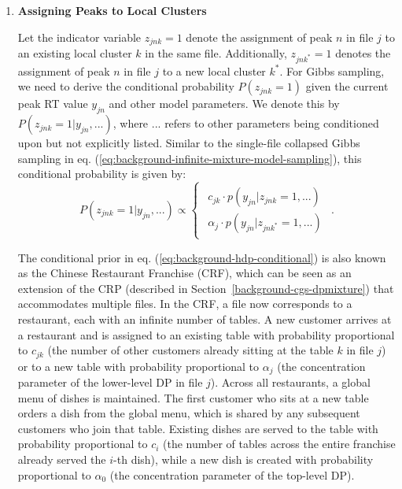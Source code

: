 \begin{enumerate}

\item \textbf{Assigning Peaks to Local Clusters}

Let the indicator variable $z_{jnk}=1$ denote the assignment of peak $n$ in file $j$ to an existing local cluster $k$ in the same file. Additionally, $z_{jnk^{*}}=1$ denotes the assignment of peak $n$ in file $j$ to a new local cluster $k^{*}$. For Gibbs sampling, we need to derive the conditional probability $P(z_{jnk}=1)$ given the current peak RT value $y_{jn}$ and other model parameters. We denote this by $P(z_{jnk}=1 \vert y_{jn}, ...)$, where $...$ refers to other parameters being conditioned upon but not explicitly listed. Similar to the single-file collapsed Gibbs sampling in eq. (\ref{eq:background-infinite-mixture-model-sampling}), this conditional probability is given by:
\begin{dmath}
P(z_{jnk}=1 \vert y_{jn}, ...)\propto\begin{cases}
\begin{array}{c}
c_{jk}\cdot p(y_{jn} \vert z_{jnk}=1,...)\\
\alpha_{j}\cdot p(y_{jn} \vert z_{jnk^{*}}=1,...)
\end{array}\end{cases}.\label{eq:background-hdp-conditional}
\end{dmath}

The conditional prior in eq. (\ref{eq:background-hdp-conditional}) is also known as the Chinese Restaurant Franchise (CRF), which can be seen as an extension of the CRP (described in Section~\ref{background-cgs-dpmixture}) that accommodates multiple files. In the CRF, a file now corresponds to a restaurant, each with an infinite number of tables. A new customer arrives at a restaurant and is assigned to an existing table with probability proportional to $c_{jk}$ (the number of other customers already sitting at the table $k$ in file $j$) or to a new table with probability proportional to $\alpha_j$ (the concentration parameter of the lower-level DP in file $j$). Across all restaurants, a global menu of dishes is maintained. The first customer who sits at a new table orders a dish from the global menu, which is shared by any subsequent customers who join that table. Existing dishes are served to the table with probability proportional to $c_i$ (the number of tables across the entire franchise already served the $i$-th dish), while a new dish is created with probability proportional to $\alpha_0$ (the concentration parameter of the top-level DP).


\end{enumerate}
